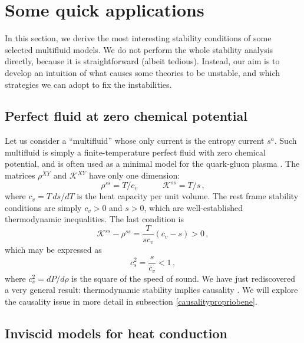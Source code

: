 \documentclass[a4paper, amsfonts, amssymb, amsmath, reprint, showkeys, nofootinbib, twoside, onecolumn,notitlepage]{revtex4-1}
\newcommand{\spc}{\quad \quad \quad}
\theoremstyle{definition}
\theoremstyle{theorem}
\begin{document}
\section{Some quick applications}\label{quickona}

In this section, we derive the most interesting stability conditions of some selected multifluid models. We do not perform the whole stability analysis directly, because it is straightforward (albeit tedious). Instead, our aim is to develop an intuition of what causes some theories to be unstable, and which strategies we can adopt to fix the instabilities. 




\subsection{Perfect fluid at zero chemical potential}\label{lesempietto}

Let us consider a ``multifluid'' whose only current is the entropy current $s^a$. Such multifluid is simply a finite-temperature perfect fluid with zero chemical potential, and is often used as a minimal model for the quark-gluon plasma \cite{FlorkowskiReview2018}. The matrices $\rho^{XY}$ and $\mathcal{K}^{XY}$ have only one dimension:
\begin{equation}
\rho^{ss}= T/c_v \spc \mathcal{K}^{ss} = T/s \, ,
\end{equation}
where $c_v = T \, ds/dT$ is the heat capacity per unit volume. The rest frame stability conditions are simply $c_v >0$ and $s>0$, which are well-established thermodynamic inequalities. The last condition is
\begin{equation}
\mathcal{K}^{ss}-\rho^{ss}= \dfrac{T}{sc_v} (c_v-s)>0 \, ,
\end{equation}
which may be expressed as
\begin{equation}
c_s^2 = \dfrac{s}{c_v} < 1 \, ,
\end{equation}
where $c_s^2= dP/d\rho$ is the square of the speed of sound. We have just rediscovered a very general result: thermodynamic stability implies causality \cite{GavassinoCausality2021}. We will explore the causality issue in more detail in subsection \ref{causalitypropriobene}.


\subsection{Inviscid models for heat conduction}\label{Heattuz}
\end{document}
